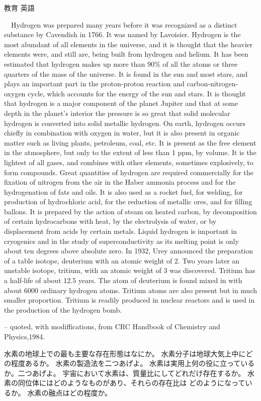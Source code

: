 \documentclass[fleqn]{jbook}
\begin{document}
\begin{question}{教育 英語}{}
\begin{subquestions}
  　Hydrogen was prepared many years before it was recognized as a
  distinct substance by Cavendish in 1766. It was named by Lavoisier.
  Hydrogen is the most abundant of all elements in the universe, and
  it is thought that the heavier elements were, and still are, being
  built from hydrogen and helium. It has been estimated that hydrogen
  makes up more than 90\% of all the atoms or three quarters of the
  mass of the universe. It is found in the sun and most stars, and
  plays an important part in the proton-proton reaction and
  carbon-nitrogen-oxygen cycle, which accounts for the energy of the
  sun and stars. It is thought that hydrogen is a major component of
  the planet Jupiter and that at some depth in the planet's interior 
  the pressure is so great that solid molecular hydrogen is converted
  into solid metallic hydrogen. On earth, hydrogen occurs chiefly in
  combination with oxygen in water, but it is also present in organic
  matter such as living plants, petroleum, coal, etc. It is present
  as the free element in the atmosphere, but only to the extent of
  less than 1 ppm, by volume. It is the lightest of all gases, and
  combines with other elements, sometimes explosively, to form
  compounds. Great quantities of hydrogen are required commercially
  for the fixation of nitrogen from the air in the Haber ammonia
  process and for the hydrogenation of fats and oils. It is also used
  as a rocket fuel, for welding, for production of hydrochloric acid, 
  for the reduction of metallic ores, and for filling ballons. It is
  prepared by the action of steam on heated carbon, by decomposition
  of certain hydrocarbons with heat, by the electrolysis of water, or
  by displacement from acids by certain metals. Liquid hydrogen is
  important in cryogenics and in the study of superconductivity as its
  melting point is only about ten degrees above absolute zero. In 1932,
  Urey announced the preparation of a table isotope, deuterium with an
  atomic weight of 2. Two years later an unstable isotope, tritium, 
  with an atomic weight of 3 was discovered. Tritium has a half-life
  of about 12.5 years. The atom of deuterium is found mixed in with
  about 6000 ordinary hydrogen atoms. Tritium atoms are also present
  but in much smaller proportion. Tritium is readily produced in
  nuclear reactors and is used in the production of the hydrogen bomb.
%
  \begin{flushright}
  -- quoted, with modiffications,   from CRC Handbook of Chemistry and Physics,1984.
  \end{flushright}
\baselineskip=15pt
%
  \begin{subsubquestions}
  \SubSubQuestion
    水素の地球上での最も主要な存在形態はなにか。
  \SubSubQuestion
    水素分子は地球大気上中にどの程度あるか。
  \SubSubQuestion
    水素の製造法を二つあげよ。
  \SubSubQuestion
    水素は実用上何の役に立っているか。二つあげよ。
  \SubSubQuestion
    宇宙において水素は、質量比にしてどれだけ存在するか。
  \SubSubQuestion
    水素の同位体にはどのようなものがあり、それらの存在比は
    どのようになっているか。
  \SubSubQuestion
    水素の融点はどの程度か。
  \end{subsubquestions}


\end{subquestions}
\end{question}
\end{document}
